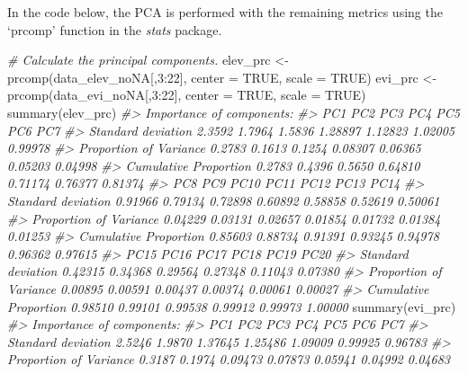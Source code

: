 \documentclass[
]{article}
\newenvironment{Shaded}{\begin{snugshade}}{\end{snugshade}}
\newcommand{\AttributeTok}[1]{\textcolor[rgb]{0.77,0.63,0.00}{#1}}
\newcommand{\CommentTok}[1]{\textcolor[rgb]{0.56,0.35,0.01}{\textit{#1}}}
\newcommand{\ConstantTok}[1]{\textcolor[rgb]{0.00,0.00,0.00}{#1}}
\newcommand{\DecValTok}[1]{\textcolor[rgb]{0.00,0.00,0.81}{#1}}
\newcommand{\FunctionTok}[1]{\textcolor[rgb]{0.00,0.00,0.00}{#1}}
\newcommand{\NormalTok}[1]{#1}
\newcommand{\OtherTok}[1]{\textcolor[rgb]{0.56,0.35,0.01}{#1}}
\newcommand{\SpecialCharTok}[1]{\textcolor[rgb]{0.00,0.00,0.00}{#1}}
\begin{document}
In the code below, the PCA is performed with the remaining metrics using
the `prcomp' function in the \emph{stats} package.

\begin{Shaded}
\begin{Highlighting}[]
\CommentTok{\# Calculate the principal components.}
\NormalTok{elev\_prc }\OtherTok{\textless{}{-}} \FunctionTok{prcomp}\NormalTok{(data\_elev\_noNA[,}\DecValTok{3}\SpecialCharTok{:}\DecValTok{22}\NormalTok{], }\AttributeTok{center =} \ConstantTok{TRUE}\NormalTok{, }\AttributeTok{scale =} \ConstantTok{TRUE}\NormalTok{)}
\NormalTok{evi\_prc }\OtherTok{\textless{}{-}} \FunctionTok{prcomp}\NormalTok{(data\_evi\_noNA[,}\DecValTok{3}\SpecialCharTok{:}\DecValTok{22}\NormalTok{], }\AttributeTok{center =} \ConstantTok{TRUE}\NormalTok{, }\AttributeTok{scale =} \ConstantTok{TRUE}\NormalTok{)}
\FunctionTok{summary}\NormalTok{(elev\_prc)}
\CommentTok{\#\textgreater{} Importance of components:}
\CommentTok{\#\textgreater{}                           PC1    PC2    PC3     PC4     PC5     PC6     PC7}
\CommentTok{\#\textgreater{} Standard deviation     2.3592 1.7964 1.5836 1.28897 1.12823 1.02005 0.99978}
\CommentTok{\#\textgreater{} Proportion of Variance 0.2783 0.1613 0.1254 0.08307 0.06365 0.05203 0.04998}
\CommentTok{\#\textgreater{} Cumulative Proportion  0.2783 0.4396 0.5650 0.64810 0.71174 0.76377 0.81374}
\CommentTok{\#\textgreater{}                            PC8     PC9    PC10    PC11    PC12    PC13    PC14}
\CommentTok{\#\textgreater{} Standard deviation     0.91966 0.79134 0.72898 0.60892 0.58858 0.52619 0.50061}
\CommentTok{\#\textgreater{} Proportion of Variance 0.04229 0.03131 0.02657 0.01854 0.01732 0.01384 0.01253}
\CommentTok{\#\textgreater{} Cumulative Proportion  0.85603 0.88734 0.91391 0.93245 0.94978 0.96362 0.97615}
\CommentTok{\#\textgreater{}                           PC15    PC16    PC17    PC18    PC19    PC20}
\CommentTok{\#\textgreater{} Standard deviation     0.42315 0.34368 0.29564 0.27348 0.11043 0.07380}
\CommentTok{\#\textgreater{} Proportion of Variance 0.00895 0.00591 0.00437 0.00374 0.00061 0.00027}
\CommentTok{\#\textgreater{} Cumulative Proportion  0.98510 0.99101 0.99538 0.99912 0.99973 1.00000}
\FunctionTok{summary}\NormalTok{(evi\_prc)}
\CommentTok{\#\textgreater{} Importance of components:}
\CommentTok{\#\textgreater{}                           PC1    PC2     PC3     PC4     PC5     PC6     PC7}
\CommentTok{\#\textgreater{} Standard deviation     2.5246 1.9870 1.37645 1.25486 1.09009 0.99925 0.96783}
\CommentTok{\#\textgreater{} Proportion of Variance 0.3187 0.1974 0.09473 0.07873 0.05941 0.04992 0.04683}

\end{Highlighting}
\end{Shaded}
\end{document}
